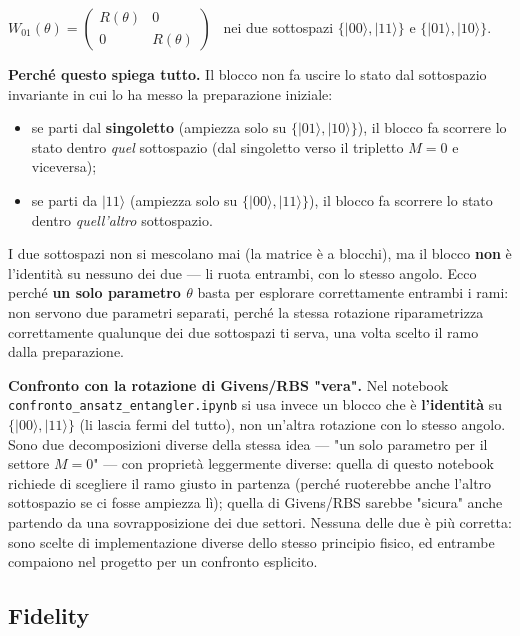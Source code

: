 \documentclass[11pt,a4paper]{article}
\begin{document}
\begin{keyeq}
\centering
$W_{01}(\theta) = \begin{pmatrix} R(\theta) & 0 \\ 0 & R(\theta)\end{pmatrix}$
\ nei due sottospazi $\{|00\rangle,|11\rangle\}$ e $\{|01\rangle,|10\rangle\}$.
\end{keyeq}

\textbf{Perché questo spiega tutto.} Il blocco non fa uscire lo stato
dal sottospazio invariante in cui lo ha messo la preparazione iniziale:
\begin{itemize}[leftmargin=1.3em,itemsep=0.1em]
\item se parti dal \textbf{singoletto} (ampiezza solo su
$\{|01\rangle,|10\rangle\}$), il blocco fa scorrere lo stato dentro
\emph{quel} sottospazio (dal singoletto verso il tripletto $M=0$ e
viceversa);
\item se parti da $|11\rangle$ (ampiezza solo su
$\{|00\rangle,|11\rangle\}$), il blocco fa scorrere lo stato dentro
\emph{quell'altro} sottospazio.
\end{itemize}

I due sottospazi non si mescolano mai (la matrice è a blocchi), ma il
blocco \textbf{non} è l'identità su nessuno dei due --- li ruota
entrambi, con lo stesso angolo. Ecco perché \textbf{un solo parametro
$\theta$} basta per esplorare correttamente entrambi i rami: non
servono due parametri separati, perché la stessa rotazione
riparametrizza correttamente qualunque dei due sottospazi ti serva, una
volta scelto il ramo dalla preparazione.

\textbf{Confronto con la rotazione di Givens/RBS "vera".} Nel notebook
\texttt{confronto\_ansatz\_entangler.ipynb} si usa invece un blocco che
è \textbf{l'identità} su $\{|00\rangle,|11\rangle\}$ (li lascia fermi
del tutto), non un'altra rotazione con lo stesso angolo. Sono due
decomposizioni diverse della stessa idea --- "un solo parametro per il
settore $M=0$" --- con proprietà leggermente diverse: quella di questo
notebook richiede di scegliere il ramo giusto in partenza (perché
ruoterebbe anche l'altro sottospazio se ci fosse ampiezza lì); quella di
Givens/RBS sarebbe "sicura" anche partendo da una sovrapposizione dei
due settori. Nessuna delle due è più corretta: sono scelte di
implementazione diverse dello stesso principio fisico, ed entrambe
compaiono nel progetto per un confronto esplicito.

\subsection*{Fidelity}
\end{document}
